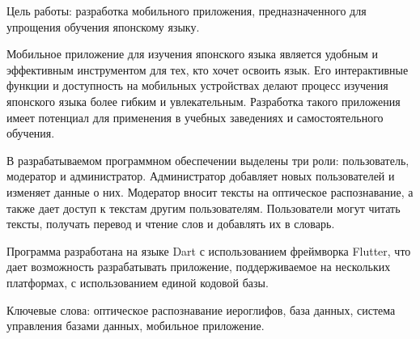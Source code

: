 \begin{essay}{}
    Цель работы: разработка мобильного приложения, предназначенного для упрощения обучения японскому языку.

    Мобильное приложение для изучения японского языка является удобным и эффективным инструментом для тех, кто хочет освоить язык. Его интерактивные функции и доступность на мобильных устройствах делают процесс изучения японского языка более гибким и увлекательным. Разработка такого приложения имеет потенциал для применения в учебных заведениях и самостоятельного обучения.

    В разрабатываемом программном обеспечении выделены три роли: пользователь, модератор и администратор. Администратор добавляет новых пользователей и изменяет данные о них. Модератор вносит тексты на оптическое распознавание, а также дает доступ к текстам другим пользователям. Пользователи могут читать тексты, получать перевод и чтение слов и добавлять их в словарь.

    Программа разработана на языке Dart с использованием фреймворка Flutter, что дает возможность разрабатывать приложение, поддерживаемое на нескольких платформах, с использованием единой кодовой базы.

    Ключевые слова: оптическое распознавание иероглифов, база данных, система управления базами данных, мобильное приложение.
\end{essay}
